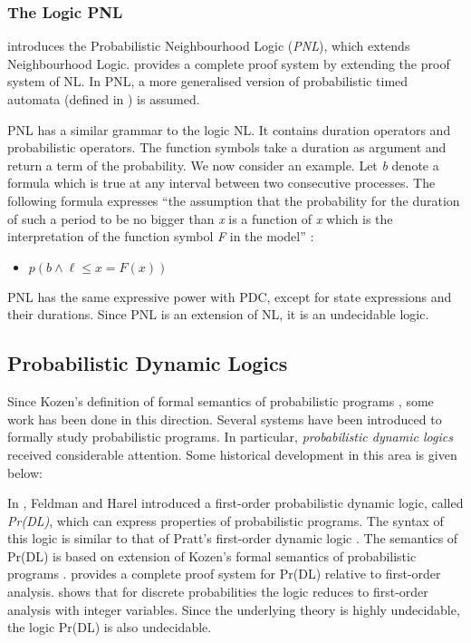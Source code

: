 \documentclass[11pt]{article}
\begin{document}
\subsubsection{The Logic PNL}

\cite{Gue00b} introduces the Probabilistic Neighbourhood Logic (\textit{PNL}), which extends Neighbourhood Logic.
\cite{Gue00b} provides a complete proof system by extending the proof system of NL. In PNL, a more generalised version of probabilistic timed automata (defined in \cite{HC94}) is assumed. 

PNL has a similar grammar to the logic NL. It contains duration operators and probabilistic operators. The function symbols take a duration as argument and return a term of the probability. We now consider an example. Let \emph{b} denote a formula which is true at any interval between two consecutive processes. The following formula expresses ``the assumption that the probability for the duration of such a period to be no bigger than \emph{x} is a function of \emph{x} which is the interpretation of the function symbol \emph{F} in the model''  \cite{Gue00c}:

\begin{itemize}
\item $p(b\wedge\ell\leq x = F(x))$
\end{itemize}

PNL has the same expressive power with PDC, except for state expressions and their durations. Since PNL is an extension of NL, it is an undecidable logic.

\subsection{Probabilistic Dynamic Logics}

Since Kozen's definition of formal semantics of probabilistic programs  \cite{Koz79}, some work has been done in this direction. Several systems have been introduced to formally study probabilistic programs. In particular, \emph{probabilistic dynamic logics} received considerable attention. Some historical development in this area is given below:

In \cite{FH82}, Feldman and Harel introduced a first-order probabilistic dynamic logic, called \emph{Pr(DL)}, which can express properties of probabilistic programs. The syntax of this logic is similar to that of Pratt's first-order dynamic logic \cite{Pra76}. The semantics of Pr(DL) is based on extension of Kozen's formal semantics of probabilistic programs \cite{Koz79}. \cite{FH82} provides a complete proof system for Pr(DL) relative to first-order analysis. \cite{FH82} shows that for discrete probabilities the logic reduces to first-order analysis with integer variables.  Since the underlying theory is highly undecidable, the logic  Pr(DL) is also undecidable.
\end{document}
